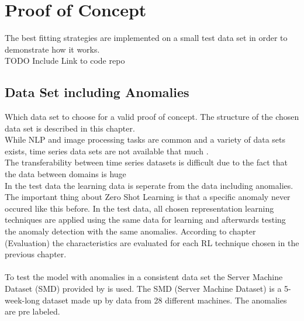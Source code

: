 \section{Proof of Concept}\label{implementation}
The best fitting strategies are implemented on a small test data set in order to demonstrate how it works.\\
TODO Include Link to code repo
\subsection{Data Set including Anomalies}
Which data set to choose for a valid proof of concept. The structure of the chosen data set is described in this chapter.\\
While NLP and image processing tasks are common and a variety of data sets exists, time series data sets are not available that much \cite{ma_survey_2023}. \\
The transferability between time series datasets is difficult due to the fact that the data between domains is huge \cite{ma_survey_2023}\\
In the test data the learning data is seperate from the data including anomalies. The important thing about Zero Shot Learning is that a specific anomaly never occured like this before. In the test data, all chosen representation learning techniques are applied using the same data for learning and afterwards testing the anomaly detection with the same anomalies. According to chapter (Evaluation) the characteristics are evaluated for each RL technique chosen in the previous chapter.\\\\
To test the model with anomalies in a consistent data set the Server Machine Dataset (SMD) provided by  is used. The SMD (Server Machine Dataset) is a 5-week-long dataset made up by data from 28 different machines. The anomalies are pre labeled.\\\\
%
%
%
